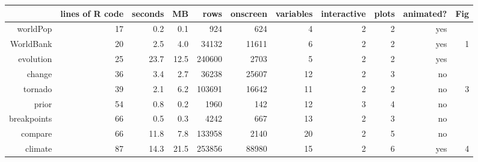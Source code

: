 \begin{tabular}{rrrrrrrrrrr}
  \hline
 & lines of R code & seconds & MB & rows & onscreen & variables & interactive & plots & animated? & Fig \\ 
  \hline
worldPop & 17 & 0.2 & 0.1 & 924 & 624 &  4 &  2 &  2 & yes &  \\ 
  WorldBank & 20 & 2.5 & 4.0 & 34132 & 11611 &  6 &  2 &  2 & yes &  1 \\ 
  evolution & 25 & 23.7 & 12.5 & 240600 & 2703 &  5 &  2 &  2 & yes &  \\ 
  change & 36 & 3.4 & 2.7 & 36238 & 25607 & 12 &  2 &  3 & no &  \\ 
  tornado & 39 & 2.1 & 6.2 & 103691 & 16642 & 11 &  2 &  2 & no &  3 \\ 
  prior & 54 & 0.8 & 0.2 & 1960 & 142 & 12 &  3 &  4 & no &  \\ 
  breakpoints & 66 & 0.5 & 0.3 & 4242 & 667 & 13 &  2 &  3 & no &  \\ 
  compare & 66 & 11.8 & 7.8 & 133958 & 2140 & 20 &  2 &  5 & no &  \\ 
  climate & 87 & 14.3 & 21.5 & 253856 & 88980 & 15 &  2 &  6 & yes &  4 \\ 
   \hline
\end{tabular}
